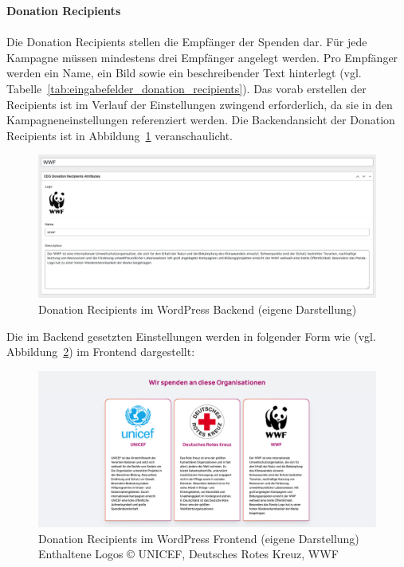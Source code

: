 \textbf{Donation Recipients}\\\\
Die Donation Recipients stellen die Empfänger der Spenden dar.
Für jede Kampagne müssen mindestens drei Empfänger angelegt werden.
Pro Empfänger werden ein Name, ein Bild sowie ein beschreibender Text hinterlegt (vgl. Tabelle~\ref{tab:eingabefelder_donation_recipients}).
Das vorab erstellen der Recipients ist im Verlauf der Einstellungen zwingend erforderlich, da sie in den Kampagneneinstellungen referenziert werden.
Die Backendansicht der Donation Recipients ist in Abbildung~\ref{fig:donation-recipients-settings-legacy} veranschaulicht.
\begin{figure}[H]
    \centering
    \includegraphics[width=1\textwidth]{images/legacy_donation_recipients_backend}
    \caption{Donation Recipients im WordPress Backend (eigene Darstellung)}
    \label{fig:donation-recipients-settings-legacy}
\end{figure}
Die im Backend gesetzten Einstellungen werden in folgender Form wie (vgl. Abbildung~\ref{fig:donation-recipients-frontend-legacy}) im Frontend dargestellt:
\begin{figure}[H]
    \centering
    \includegraphics[width=1\textwidth]{images/legacy_donation_recipients_frontend}
    \caption{Donation Recipients im WordPress Frontend (eigene Darstellung)\\Enthaltene Logos © UNICEF, Deutsches Rotes Kreuz, WWF \cite{ngo_logos}}
    \label{fig:donation-recipients-frontend-legacy}
\end{figure}

